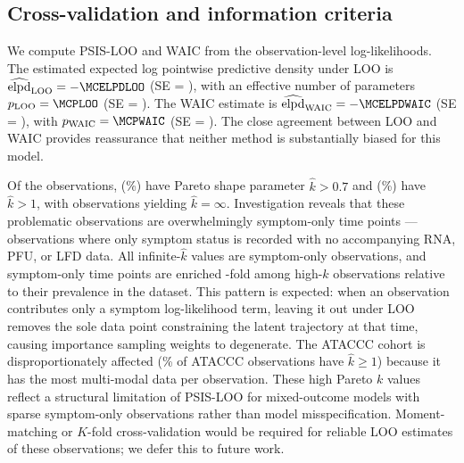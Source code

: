 \documentclass[12pt]{article}
\begin{document}
\subsection{Cross-validation and information criteria}
We compute PSIS-LOO and WAIC from the observation-level log-likelihoods. The estimated expected log pointwise predictive density under LOO is $\widehat{\text{elpd}}_{\text{LOO}} = {-\MCELPDLOO}$ (SE = \MCELPDLOOSE), with an effective number of parameters $p_{\text{LOO}} = \MCPLOO$ (SE = \MCPLOOSE). The WAIC estimate is $\widehat{\text{elpd}}_{\text{WAIC}} = {-\MCELPDWAIC}$ (SE = \MCELPDWAICSE), with $p_{\text{WAIC}} = \MCPWAIC$ (SE = \MCPWAICSE). The close agreement between LOO and WAIC provides reassurance that neither method is substantially biased for this model.

Of the \MCNObs{} observations, \MCNKGTSeven{} (\MCPctKGTSeven\%) have Pareto shape parameter $\hat{k} > 0.7$ and \MCNKGTOne{} (\MCPctKGTOne\%) have $\hat{k} > 1$, with \MCNKInf{} observations yielding $\hat{k} = \infty$. Investigation reveals that these problematic observations are overwhelmingly symptom-only time points --- observations where only symptom status is recorded with no accompanying RNA, PFU, or LFD data. All \MCNSymOnlyInf{} infinite-$\hat{k}$ values are symptom-only observations, and symptom-only time points are enriched \MCEnrichSymHighK-fold among high-$\hat{k}$ observations relative to their prevalence in the dataset. This pattern is expected: when an observation contributes only a symptom log-likelihood term, leaving it out under LOO removes the sole data point constraining the latent trajectory at that time, causing importance sampling weights to degenerate. The ATACCC cohort is disproportionately affected (\MCPctATACCCKGEOne\% of ATACCC observations have $\hat{k} \geq 1$) because it has the most multi-modal data per observation. These high Pareto $k$ values reflect a structural limitation of PSIS-LOO for mixed-outcome models with sparse symptom-only observations rather than model misspecification. Moment-matching or $K$-fold cross-validation would be required for reliable LOO estimates of these observations; we defer this to future work.
\end{document}
